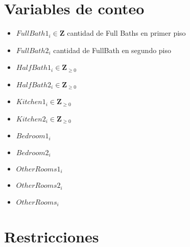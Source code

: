 \documentclass{article}
\begin{document}
\section{Variables de conteo}
\begin{itemize}
    \item $FullBath1_{i}\in \mathbf{Z}$ cantidad de Full Baths en primer piso
    \item $FullBath2_{i}$ cantidad de FullBath en segundo piso
    \item $HalfBath1_{i} \in \mathbf{Z}_{\geq 0}$
    \item $HalfBath2_{i} \in \mathbf{Z}_{\geq 0}$
    \item $Kitchen1_{i} \in \mathbf{Z}_{\geq 0}$
    \item $Kitchen2_{i} \in \mathbf{Z}_{\geq 0}$
    \item $Bedroom1_{i}$
    \item $Bedroom2_{i}$
    \item $OtherRooms1_{i}$
    \item $OtherRooms2_{i}$
    \item $OtherRooms_{i}$
\end{itemize}

\section{Restricciones}
\end{document}
